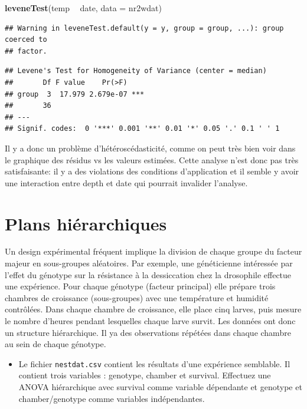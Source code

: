 \documentclass[12pt,]{book}
\newenvironment{Shaded}{\begin{snugshade}}{\end{snugshade}}
\newcommand{\DataTypeTok}[1]{\textcolor[rgb]{0.13,0.29,0.53}{#1}}
\newcommand{\KeywordTok}[1]{\textcolor[rgb]{0.13,0.29,0.53}{\textbf{#1}}}
\newcommand{\NormalTok}[1]{#1}
\newcommand{\OperatorTok}[1]{\textcolor[rgb]{0.81,0.36,0.00}{\textbf{#1}}}
\newcommand{\StringTok}[1]{\textcolor[rgb]{0.31,0.60,0.02}{#1}}
\providecommand{\tightlist}{%
  \setlength{\itemsep}{0pt}\setlength{\parskip}{0pt}}
\begin{document}
\begin{Shaded}
\begin{Highlighting}[]
\KeywordTok{leveneTest}\NormalTok{(temp }\OperatorTok{~}\StringTok{ }\NormalTok{date, }\DataTypeTok{data =}\NormalTok{ nr2wdat)}
\end{Highlighting}
\end{Shaded}

\begin{verbatim}
## Warning in leveneTest.default(y = y, group = group, ...): group coerced to
## factor.
\end{verbatim}

\begin{verbatim}
## Levene's Test for Homogeneity of Variance (center = median)
##       Df F value    Pr(>F)    
## group  3  17.979 2.679e-07 ***
##       36                      
## ---
## Signif. codes:  0 '***' 0.001 '**' 0.01 '*' 0.05 '.' 0.1 ' ' 1
\end{verbatim}

Il y a donc un problème d'hétéroscédasticité, comme on peut très bien voir dans le graphique des résidus vs les valeurs estimées. Cette analyse n'est donc pas très satisfaisante: il y a des violations des conditions d'application et il semble y avoir une interaction entre depth et date qui pourrait invalider l'analyse.

\hypertarget{plans-hiuxe9rarchiques}{%
\section{Plans hiérarchiques}\label{plans-hiuxe9rarchiques}}

Un design expérimental fréquent implique la division de chaque groupe du facteur majeur en sous-groupes aléatoires. Par exemple, une généticienne intéressée par l'effet du génotype sur la résistance à la dessiccation chez la drosophile effectue une expérience. Pour chaque génotype (facteur principal) elle prépare trois chambres de croissance (sous-groupes) avec une température et humidité contrôlées. Dans chaque chambre de croissance, elle place cinq larves, puis mesure le nombre d'heures pendant lesquelles chaque larve survit. Les données ont donc un structure hiérarchique. Il ya des observations répétées dans chaque chambre au sein de chaque génotype.

\begin{itemize}
\tightlist
\item
  Le fichier \texttt{nestdat.csv} contient les résultats d'une expérience semblable. Il contient trois variables : genotype, chamber et survival. Effectuez une ANOVA hiérarchique avec survival comme variable dépendante et genotype et chamber/genotype comme variables indépendantes.
\end{itemize}
\end{document}

